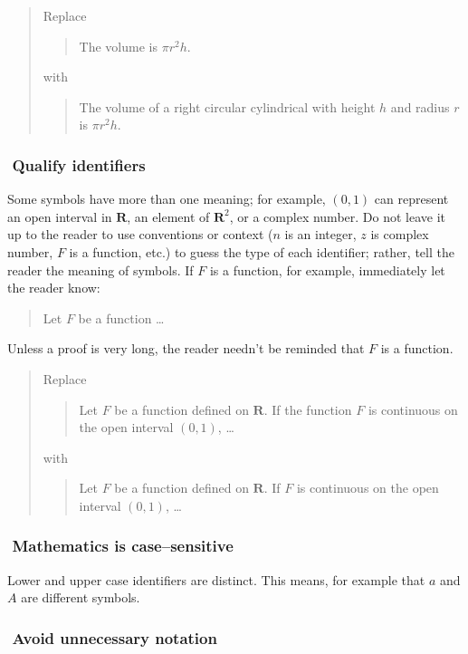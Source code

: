 \documentclass[12pt,fleqn]{article}
\newcounter{ex}\setcounter{ex}{0}
\newcommand{\ex}{%
\hspace{-0.2in} \setcounter{ex}{\value{ex}+1}
\theex \,\,}
\newcounter{id}\setcounter{id}{0}
\newcounter{se}\setcounter{se}{0}
\begin{document}
\begin{quote}
Replace
\begin{quote}
The volume is \(\pi r^2 h\).
\end{quote}
with
\begin{quote}
The volume of a right circular cylindrical with height \(h\) and
radius \(r\) is \(\pi r^2 h\).

\end{quote}
\end{quote}
\subsubsection*{\ex  Qualify identifiers} 

Some symbols have more than one meaning; for example, $(0,1)$ can
represent an open interval in $\mathbf{R}$, an element of
\(\mathbf{R}^2\), or a complex number.  Do not leave it up to the reader
to use conventions or context (\(n\) is an integer, \(z\) is complex
number, \(F\) is a function, etc.) to guess the type of each
identifier; rather, tell the reader the meaning of symbols.  If $F$ is
a function, for example, immediately let the reader know:
\begin{quote}
   Let $F$ be a function \dots
\end{quote}
Unless a proof is very long, the reader needn't be reminded that
$F$ is a function. 
\begin{quote}
Replace
\begin{quote}
  Let $F$ be a function defined on $\mathbf{R}$.  If the function $F$ is continuous on
  the open interval $(0,1)$,  \dots
\end{quote}
with
\begin{quote}
  Let \(F\) be a function defined on \(\mathbf{R}\).  If \(F\) is continuous on
  the open interval \((0,1)\), \dots
\end{quote}
\end{quote}

\subsubsection*{\ex Mathematics is case--sensitive}

Lower and upper case identifiers are distinct.  This means, for
example that \(a\) and \(A\) are different symbols.

\subsubsection*{\ex  Avoid unnecessary notation}
\end{document}
